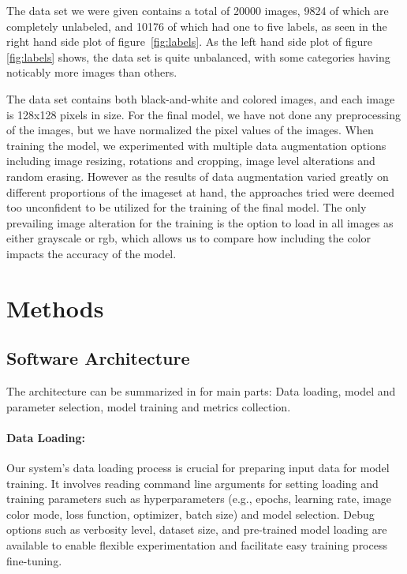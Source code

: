 \documentclass[a4paper, 12pt]{article}
\begin{document}
The data set we were given contains a total of 20000 images, 9824 of which are completely unlabeled, and 10176 of which had one to five labels, as seen in the right hand side plot of figure~\ref{fig:labels}. As the left hand side plot of figure \ref{fig:labels} shows, the data set is quite unbalanced, with some categories having noticably more images than others.


The data set contains both black-and-white and colored images, and each image is 128x128 pixels in size. For the final model, we have not done any preprocessing of the images, but we have normalized the pixel values of the images. When training the model, we experimented with multiple data augmentation options including image resizing, rotations and cropping, image level alterations and random erasing. However as the results of data augmentation varied greatly on different  proportions of the imageset at hand, the approaches tried were deemed too unconfident to be utilized for the training of the final model. The only prevailing image alteration for the training is the option to load in all images as either grayscale or rgb, which allows us to compare how including the color impacts the accuracy of the model.



\section{Methods}

\subsection{Software Architecture}


The architecture can be summarized in for main parts: Data loading, model and parameter selection, model training and metrics collection.

\paragraph{Data Loading:} 
Our system's data loading process is crucial for preparing input data for model training. It involves reading command line arguments for setting loading and training parameters such as hyperparameters (e.g., epochs, learning rate, image color mode, loss function, optimizer, batch size) and model selection. Debug options such as verbosity level, dataset size, and pre-trained model loading are available to enable flexible experimentation and facilitate easy training process fine-tuning.
\end{document}
